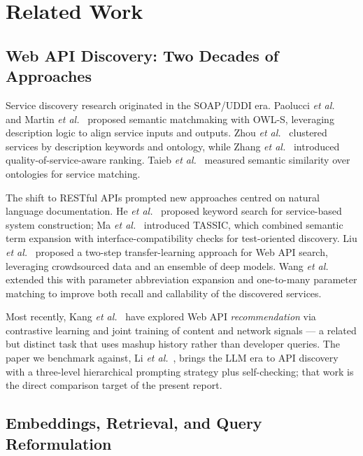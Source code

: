\documentclass[10pt,a4paper,twocolumn]{article}
\begin{document}
\section{Related Work}\label{sec:related}

\subsection{Web API Discovery: Two Decades of Approaches}

Service discovery research originated in the SOAP/UDDI era. Paolucci
\textit{et al.}~\cite{paolucci2002} and Martin
\textit{et al.}~\cite{martin2007} proposed semantic matchmaking with
OWL-S, leveraging description logic to align service inputs and
outputs. Zhou \textit{et al.}~\cite{zhou2008} clustered services by
description keywords and ontology, while
Zhang \textit{et al.}~\cite{zhang2010wsexpress} introduced
quality-of-service-aware ranking. Taieb
\textit{et al.}~\cite{taieb2014ontology} measured semantic similarity
over ontologies for service matching.

The shift to RESTful APIs prompted new approaches centred on natural
language documentation. He \textit{et al.}~\cite{he2016keyword}
proposed keyword search for service-based system construction; Ma
\textit{et al.}~\cite{ma2018tassic} introduced TASSIC, which combined
semantic term expansion with interface-compatibility checks for
test-oriented discovery. Liu \textit{et al.}~\cite{liu2020websearch}
proposed a two-step transfer-learning approach for Web API search,
leveraging crowdsourced data and an ensemble of deep models. Wang
\textit{et al.}~\cite{wang2022automated} extended this with parameter
abbreviation expansion and one-to-many parameter matching to improve
both recall and callability of the discovered services.

Most recently, Kang \textit{et al.}~\cite{kang2024recommendation,
kang2025recommendation} have explored Web API \emph{recommendation} via
contrastive learning and joint training of content and network
signals --- a related but distinct task that uses mashup history
rather than developer queries. The paper we benchmark against, Li
\textit{et al.}~\cite{li2025llm}, brings the LLM era to API discovery
with a three-level hierarchical prompting strategy plus self-checking;
that work is the direct comparison target of the present report.

\subsection{Embeddings, Retrieval, and Query Reformulation}
\end{document}

